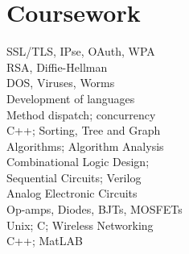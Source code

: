 \documentclass[]{resume}
\begin{document}
\begin{minipage}[t]{0.33\textwidth}
\section{Coursework}
\hspace{8pt} SSL/TLS, IPse, OAuth, WPA \\
\hspace{8pt} RSA, Diffie-Hellman \\
\hspace{8pt} DOS, Viruses, Worms \\
\vspace{4pt}
\hspace{8pt} Development of languages \\
\hspace{8pt} Method dispatch; concurrency \\
\vspace{4pt}
\hspace{8pt} C++; Sorting, Tree and Graph \\
\hspace{8pt} Algorithms; Algorithm Analysis\\
\vspace{4pt}
\hspace{8pt} Combinational Logic Design; \\
\hspace{8pt} Sequential Circuits; Verilog \\
\vspace{4pt}
\hspace{8pt} Analog Electronic Circuits \\
\hspace{8pt} Op-amps, Diodes, BJTs, MOSFETs \\
\vspace{4pt}
\hspace{8pt} Unix; C; Wireless Networking \\
\vspace{4pt}
\hspace{8pt} C++; MatLAB \\
\vspace{4pt}
\sectionsep



\end{minipage}
\end{document}
